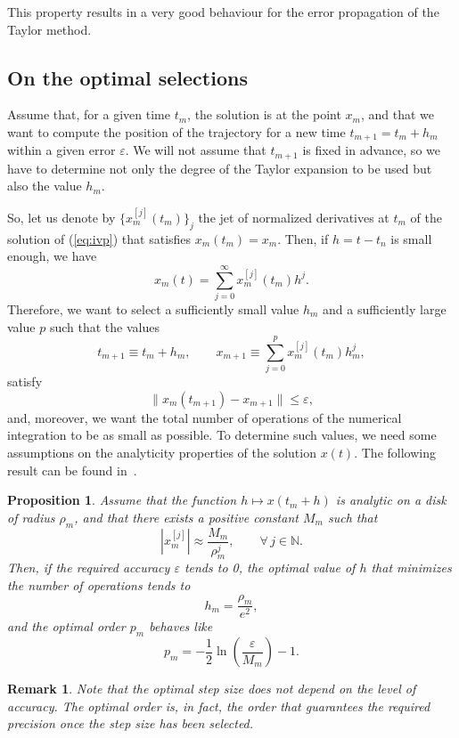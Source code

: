 \documentclass[12pt,twoside]{article}
\newtheorem{proposition}{Proposition}[section]
\newtheorem{remark}{Remark}[section]
\newcommand{\NN}{{\mathbb N}}               %
\begin{document}
This property results in a very good behaviour for the error
propagation of the Taylor method.

\subsection{On the optimal selections}
Assume that, for a given time $t_m$, the solution is at the point
$x_m$, and that we want to compute the position of the trajectory for
a new time $t_{m+1}=t_m+h_m$ within a given error $\varepsilon$. We
will not assume that $t_{m+1}$ is fixed in advance, so we have to
determine not only the degree of the Taylor expansion to be used but
also the value $h_m$.

So, let us denote by $\{x_m^{[j]}(t_m)\}_j$ the jet of normalized
derivatives at $t_m$ of the solution of (\ref{eq:ivp}) that
satisfies $x_m(t_m)=x_m$. Then, if $h=t-t_n$ is small enough, we have
\[
x_m(t)=\sum_{j=0}^{\infty} x_m^{[j]}(t_m) h^j.
\]
Therefore, we want to select a sufficiently small value $h_m$ and a
sufficiently large value $p$ such that the values
\[
t_{m+1} \equiv t_m+h_m,\qquad
x_{m+1} \equiv \sum_{j=0}^{p} x_m^{[j]}(t_m) h_m^j,
\]
satisfy
\[
\|x_m(t_{m+1})-x_{m+1}\|\le\varepsilon,
\]
and, moreover, we want the total number of operations of the numerical
integration to be as small as possible. To determine such values, we
need some assumptions on the analyticity properties of the solution
$x(t)$.  The following result can be found in~\cite{Simo01a}.

\begin{proposition}\label{prop:opt}
Assume that the function $h\mapsto x(t_m+h)$ is analytic on a disk of
radius $\rho_m$, and that there exists a positive constant $M_m$ such
that
\[
|x_m^{[j]}|\approx\frac{M_m}{\rho_m^j},\qquad \forall\, j\in\NN.
\]
Then, if the required accuracy $\varepsilon$ tends to 0, the optimal
value of $h$ that minimizes the number of operations tends to
\[
h_m=\frac{\rho_m}{e^2},
\]
and the optimal order $p_m$ behaves like
\[
p_m=-\frac{1}{2}\ln\left(\frac{\varepsilon}{M_m}\right)-1.
\]
\end{proposition}

\begin{remark}
Note that the optimal step size does not depend on the level of
accuracy. The optimal order is, in fact, the order that guarantees the
required precision once the step size has been selected.
\end{remark}
\end{document}
